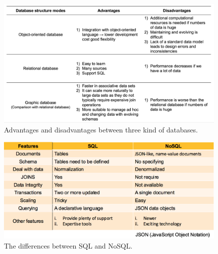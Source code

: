 \begin{figure}[ht]
	\begin{center}
		\includegraphics[width=1.8\columnwidth]{Wolverine_Method_Chart_2}
	\end{center}
	\caption{Advantages and disadvantages between three kind of databases.\label{WMC2}}	
\end{figure}
\begin{figure}[ht]
	\begin{center}
		\includegraphics[width=1.8\columnwidth]{Wolverine_Method_Chart_3}
	\end{center}
	\caption{The differences between SQL and NoSQL. \label{WMC3}}
\end{figure}

\newpage %
